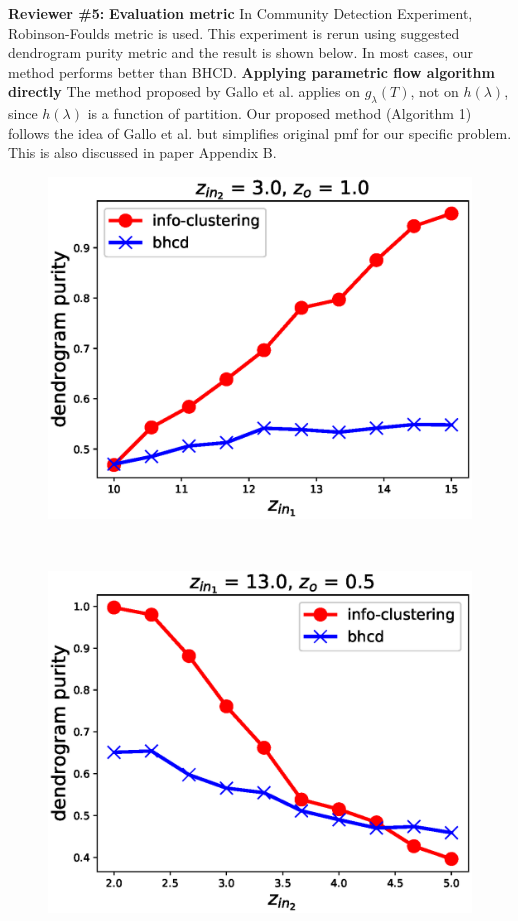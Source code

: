 \documentclass{article}
\begin{document}
\textbf{Reviewer \#5:}
\textbf{Evaluation metric} In Community Detection Experiment, Robinson-Foulds metric is used. This experiment is rerun using suggested dendrogram purity metric and the result is shown below. In most cases, our method performs better than BHCD. \textbf{Applying parametric flow algorithm directly} The method proposed by Gallo et al. applies on $g_{\lambda}(T)$, not on $h(\lambda)$, since $h(\lambda)$ is a function of partition. Our proposed method (Algorithm 1) follows the idea of Gallo et al. but simplifies original \textsf{pmf} for our specific problem.
This is also discussed in paper Appendix B.

\begin{subfigure}{0.33\textwidth}
	\includegraphics[width=\textwidth]{pic/z_in_1-dp.eps}
\end{subfigure}~
\begin{subfigure}{0.33\textwidth}
	\includegraphics[width=\textwidth]{pic/z_in_2-dp.eps}
\end{subfigure}~
\end{document}
